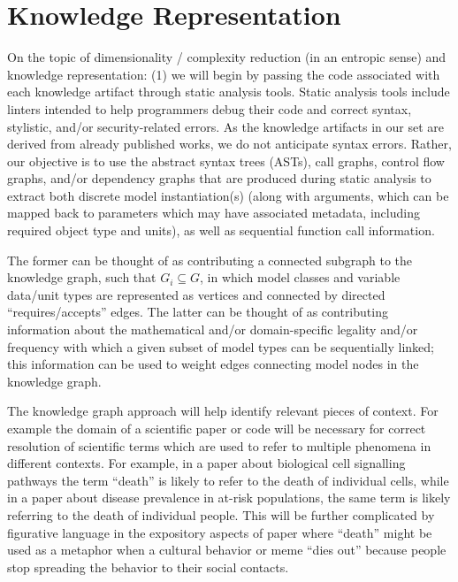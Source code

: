 \documentclass{article}
\begin{document}
\section{Knowledge Representation}
On the topic of dimensionality / complexity reduction (in an entropic sense) and knowledge representation: (1) we will begin by passing the code associated with each knowledge artifact through static analysis tools. Static analysis tools include linters intended to help programmers debug their code and correct syntax, stylistic, and/or security-related errors. As the knowledge artifacts in our set are derived from already published works, we do not anticipate syntax errors. Rather, our objective is to use the abstract syntax trees (ASTs), call graphs, control flow graphs, and/or dependency graphs that are produced during static analysis to extract both discrete model instantiation(s) (along with arguments, which can be mapped back to parameters which may have associated metadata, including required object type and units), as well as sequential function call information. 

The former can be thought of as contributing a connected subgraph to the knowledge graph, such that $G_i \subseteq G$, in which model classes and variable data/unit types are represented as vertices and connected by directed ``requires/accepts'' edges. The latter can be thought of as contributing information about the mathematical and/or domain-specific legality and/or frequency with which a given subset of model types can be sequentially linked; this information can be used to weight edges connecting model nodes in the knowledge graph.


The knowledge graph approach will help identify relevant pieces of context. For example the domain of a scientific paper or code will be necessary for correct resolution of scientific terms which are used to refer to multiple phenomena in different contexts. For example, in a paper about biological cell signalling pathways the term ``death'' is likely to refer to the death of individual cells, while in a paper about disease prevalence in at-risk populations, the same term is likely referring to the death of individual people. This will be further complicated by figurative language in the expository aspects of paper where ``death'' might be used as a metaphor when a cultural behavior or meme ``dies out'' because people stop spreading the behavior to their social contacts.
\end{document}

